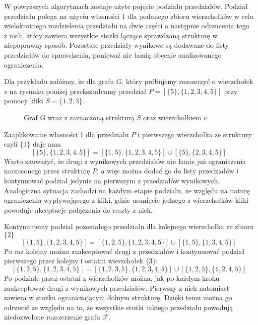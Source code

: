 W powyższych algorytmach zostaje użyte pojęcie podziału przedziałów. Podział przedziału polega na  użyciu własności 1 dla podanego zbioru wierzchołków w celu wielokrotnego rozdzielenia przedziału na dwie części a następnie odrzucenia tego z nich, który zawiera wszystkie stożki łączące sprawdzaną strukturę w niepoprawny sposób. Pozostałe przedziały wynikowe są dodawane do listy przedziałów do sprawdzenia, ponieważ nie łamią obecnie analizowanego ograniczenia. 

Dla przykładu załóżmy, że dla grafu $G$, który próbujemy rozszerzyć o wierzchołek $v$ na rysunku poniżej przekształcamy przedział $P =[\{5\},\{1,2,3,4,5\}]$ przy pomocy kliki $S = \{1,2,3\}$.
\begin{figure}[H]
  \centering
    \caption{Graf G wraz z zaznaczoną strukturą $S$ oraz wierzchołkiem $v$}
 \end{figure}
 

 Zaaplikowanie własności 1 dla przedziału $P$ i pierwszego wierzchołka ze struktury czyli $\{1\}$ daje nam 
$$[\{5\},\{1,2,3,4,5\}] = [\{1,5\},\{1,2,3,4,5\}] \cup [\{5\},\{2,3,4,5\}]$$ 
Warto zauważyć, że drugi z wynikowych przedziałów nie łamie już ograniczenia narzuconego przez strukturę $P$, a więc można dodać go do listy przedziałów i kontynuować podział jedynie na pierwszym z przedziałów wynikowych. Analogiczna sytuacja zachodzi na każdym etapie podziału, ze względu na naturę ograniczenia wypływającego z kliki, gdzie usunięcie jednego z wierzchołków kliki powoduje akceptacje połączenia do reszty z nich. 

Kontynuujemy podział pozostałego przedziału dla kolejnego wierzchołka ze zbioru $\{2\}$
$$[\{1,5\},\{1,2,3,4,5\}] = [\{1,2,5\},\{1,2,3,4,5\}] \cup [\{1,5\},\{1,3,4,5\}]$$ 
Po raz kolejny można zaakceptować drugi z przedziałów i kontynuować podział pierwszego przez kolejny i ostatni wierzchołek $\{3\}$: 
$$[\{1,2,5\},\{1,2,3,4,5\}] = [\{1,2,3,5\},\{1,2,3,4,5\}] \cup [\{1,2,5\},\{1,2,4,5\}]$$
Po podziale przez ostatni z wierzchołków można, jak po każdym kroku zaakceptować drugi z wynikowych przedziałów. Pierwszy z nich natomiast zawiera w stożku ograniczającym dolnym strukturę. Dzięki temu można go odrzucić ze względu na to, że wszystkie stożki takiego przedziału powodują niedozwolone rozszerzenie grafu $\mathcal{F}$.

